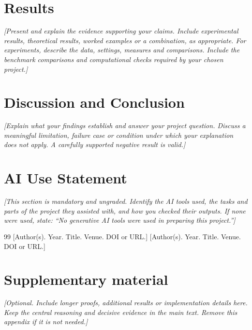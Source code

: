 \documentclass[12pt,letterpaper]{article}
\newcommand{\prompt}[1]{{\interlinepenalty=10000\textit{[#1]}\par}}
\begin{document}
\section{Results}
\prompt{Present and explain the evidence supporting your claims. Include experimental results, theoretical results, worked examples or a combination, as appropriate. For experiments, describe the data, settings, measures and comparisons. Include the benchmark comparisons and computational checks required by your chosen project.}

\section{Discussion and Conclusion}
\prompt{Explain what your findings establish and answer your project question. Discuss a meaningful limitation, failure case or condition under which your explanation does not apply. A carefully supported negative result is valid.}

\section{AI Use Statement}
\prompt{This section is mandatory and ungraded. Identify the AI tools used, the tasks and parts of the project they assisted with, and how you checked their outputs. If none were used, state: ``No generative AI tools were used in preparing this project.''}

\begin{thebibliography}{99}
 [Author(s). Year. Title. Venue. DOI or URL.]
 [Author(s). Year. Title. Venue. DOI or URL.]
\end{thebibliography}

\appendix
\section{Supplementary material}
\prompt{Optional. Include longer proofs, additional results or implementation details here. Keep the central reasoning and decisive evidence in the main text. Remove this appendix if it is not needed.}
\end{document}
